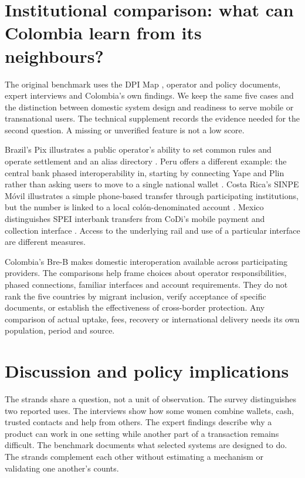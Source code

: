 \documentclass[12pt]{article}
\begin{document}
\section{Institutional comparison: what can Colombia learn from its neighbours?}
The original benchmark uses the DPI Map \citep{ucldpimap}, operator and policy documents, expert interviews and Colombia's own findings. We keep the same five cases and the distinction between domestic system design and readiness to serve mobile or transnational users. The technical supplement records the evidence needed for the second question. A missing or unverified feature is not a low score.

Brazil's Pix illustrates a public operator's ability to set common rules and operate settlement and an alias directory \citep{bcbpix}. Peru offers a different example: the central bank phased interoperability in, starting by connecting Yape and Plin rather than asking users to move to a single national wallet \citep{bcrp2025}. Costa Rica's SINPE Móvil illustrates a simple phone-based transfer through participating institutions, but the number is linked to a local colón-denominated account \citep{bccrsinpe}. Mexico distinguishes SPEI interbank transfers from CoDi's mobile payment and collection interface \citep{banxicocodi,banxicospei}. Access to the underlying rail and use of a particular interface are different measures.

Colombia's Bre-B makes domestic interoperation available across participating providers. The comparisons help frame choices about operator responsibilities, phased connections, familiar interfaces and account requirements. They do not rank the five countries by migrant inclusion, verify acceptance of specific documents, or establish the effectiveness of cross-border protection. Any comparison of actual uptake, fees, recovery or international delivery needs its own population, period and source.

\section{Discussion and policy implications}
The strands share a question, not a unit of observation. The survey distinguishes two reported uses. The interviews show how some women combine wallets, cash, trusted contacts and help from others. The expert findings describe why a product can work in one setting while another part of a transaction remains difficult. The benchmark documents what selected systems are designed to do. The strands complement each other without estimating a mechanism or validating one another's counts.
\end{document}
